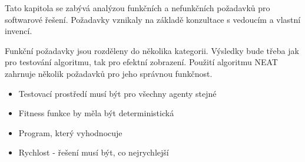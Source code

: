 Tato kapitola se zabývá analýzou funkčních a nefunkčních požadavků pro softwarové řešení. Požadavky vznikaly na základě konzultace s vedoucím a vlastní invencí.

Funkční požadavky jsou rozděleny do několika kategorii.
Výsledky bude třeba jak pro testování algoritmu, tak pro efektní zobrazení.
Použití algoritmu NEAT zahrnuje několik požadavků pro jeho správnou funkčnost.
\begin{itemize}
	\item Testovací prostředí musí být pro všechny agenty stejné
	\item Fitness funkce by měla být deterministická
	\item Program, který vyhodnocuje 
\end{itemize}

\begin{itemize}
	\item Rychlost - řešení musí být, co nejrychlejší
\end{itemize}

